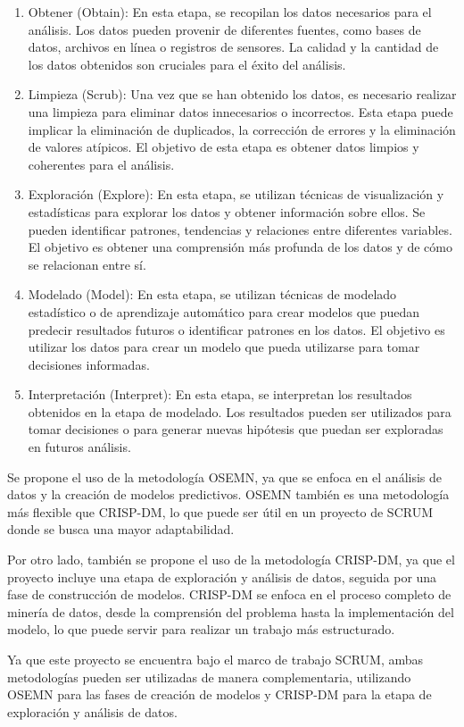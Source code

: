 \begin{enumerate}
    \item Obtener (Obtain): En esta etapa, se recopilan los datos necesarios para el análisis. Los datos pueden provenir de diferentes fuentes, como bases de datos, archivos en línea o registros de sensores. La calidad y la cantidad de los datos obtenidos son cruciales para el éxito del análisis.
    \item Limpieza (Scrub): Una vez que se han obtenido los datos, es necesario realizar una limpieza para eliminar datos innecesarios o incorrectos. Esta etapa puede implicar la eliminación de duplicados, la corrección de errores y la eliminación de valores atípicos. El objetivo de esta etapa es obtener datos limpios y coherentes para el análisis.
    \item Exploración (Explore): En esta etapa, se utilizan técnicas de visualización y estadísticas para explorar los datos y obtener información sobre ellos. Se pueden identificar patrones, tendencias y relaciones entre diferentes variables. El objetivo es obtener una comprensión más profunda de los datos y de cómo se relacionan entre sí.
    \item Modelado (Model): En esta etapa, se utilizan técnicas de modelado estadístico o de aprendizaje automático para crear modelos que puedan predecir resultados futuros o identificar patrones en los datos. El objetivo es utilizar los datos para crear un modelo que pueda utilizarse para tomar decisiones informadas.
    \item Interpretación (Interpret): En esta etapa, se interpretan los resultados obtenidos en la etapa de modelado. Los resultados pueden ser utilizados para tomar decisiones o para generar nuevas hipótesis que puedan ser exploradas en futuros análisis.
\end{enumerate}

Se propone el uso de la metodología OSEMN, ya que se enfoca en el análisis de datos y la creación de modelos predictivos. OSEMN también es una metodología más flexible que CRISP-DM, lo que puede ser útil en un proyecto de SCRUM donde se busca una mayor adaptabilidad.

Por otro lado, también se propone el uso de la metodología CRISP-DM, ya que el proyecto incluye una etapa de exploración y análisis de datos, seguida por una fase de construcción de modelos. CRISP-DM se enfoca en el proceso completo de minería de datos, desde la comprensión del problema hasta la implementación del modelo, lo que puede servir para realizar un trabajo más estructurado.

Ya que este proyecto se encuentra bajo el marco de trabajo SCRUM, ambas metodologías pueden ser utilizadas de manera complementaria, utilizando OSEMN para las fases de creación de modelos y CRISP-DM para la etapa de exploración y análisis de datos.
